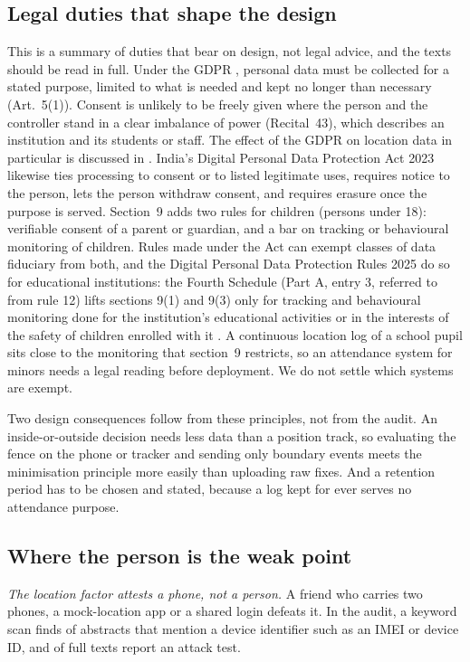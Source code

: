 \documentclass[12pt]{article}
\let\cite\citep
\begin{document}
\subsection{Legal duties that shape the design}
This is a summary of duties that bear on design, not legal advice, and the texts should be read in full. Under the GDPR \cite{gdpr2016}, personal data must be collected for a stated purpose, limited to what is needed and kept no longer than necessary (Art.~5(1)). Consent is unlikely to be freely given where the person and the controller stand in a clear imbalance of power (Recital~43), which describes an institution and its students or staff. The effect of the GDPR on location data in particular is discussed in \cite{georgiadou2019location}. India's Digital Personal Data Protection Act 2023 \cite{dpdp2023} likewise ties processing to consent or to listed legitimate uses, requires notice to the person, lets the person withdraw consent, and requires erasure once the purpose is served. Section~9 adds two rules for children (persons under 18): verifiable consent of a parent or guardian, and a bar on tracking or behavioural monitoring of children. Rules made under the Act can exempt classes of data fiduciary from both, and the Digital Personal Data Protection Rules 2025 do so for educational institutions: the Fourth Schedule (Part A, entry 3, referred to from rule 12) lifts sections 9(1) and 9(3) only for tracking and behavioural monitoring done for the institution's educational activities or in the interests of the safety of children enrolled with it \cite{dpdp2025rules}. A continuous location log of a school pupil sits close to the monitoring that section~9 restricts, so an attendance system for minors needs a legal reading before deployment. We do not settle which systems are exempt.

Two design consequences follow from these principles, not from the audit. An inside-or-outside decision needs less data than a position track, so evaluating the fence on the phone or tracker and sending only boundary events meets the minimisation principle more easily than uploading raw fixes. And a retention period has to be chosen and stated, because a log kept for ever serves no attendance purpose.

\subsection{Where the person is the weak point}
\emph{The location factor attests a phone, not a person.} A friend who carries two phones, a mock-location app or a shared login defeats it. In the audit, a keyword scan finds \hfDevBind{} of \hfN{} abstracts that mention a device identifier such as an IMEI or device ID, and \ftQthree{} of \ftN{} full texts report an attack test.
\end{document}
